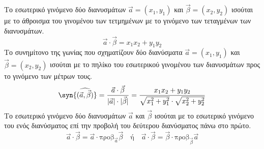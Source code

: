 \documentclass[twoside,nofonts,internet,shmeiwseis]{thewria}
\begin{document}
Το εσωτερικό γινόμενο δύο διανυσμάτων $ \vec{a}=(x_1,y_1) $ και $ \vec{\beta}=(x_2,y_2) $ ισούται με το άθροισμα του γινομένου των τετμημένων με το γινόμενο των τεταγμένων των διανυσμάτων.
\[ \vec{a}\cdot\vec{\beta}=x_1x_2+y_1y_2 \]
Το συνημίτονο της γωνίας που σχηματίζουν δύο διανύσματα $ \vec{a}=(x_1,y_1) $ και $ \vec{\beta}=(x_2,y_2) $ ισούται με το πηλίκο του εσωτερικού γινομένου των διανυσμάτων προς το γινόμενο των μέτρων τους.
\[ \syn{(\widehat{\vec{a},\vec{\beta}})}=\frac{\vec{a}\cdot\vec{\beta}}{|\vec{a}|\cdot|\vec{\beta}|}=\frac{x_1x_2+y_1y_2}{\sqrt{x_1^2+y_1^2}\cdot\sqrt{x_2^2+y_2^2}} \]
Το εσωτερικό γινόμενο δύο διανυσμάτων $ \vec{a} $ και $ \vec{\beta} $ ισούται με το εσωτερικό γινόμενο του ενός διανύσματος επί την προβολή του δεύτερου διανύσματος πάνω στο πρώτο.
\[ \vec{a}\cdot\vec{\beta}=\vec{a}\cdot\textrm{προβ}_{\vec{a}}{\vec{\beta}}\quad\textrm{ή}\quad\vec{a}\cdot\vec{\beta}=\vec{\beta}\cdot\textrm{προβ}_{\vec{\beta}}{\vec{a}} \]
\newpage
\noindent
\end{document}
